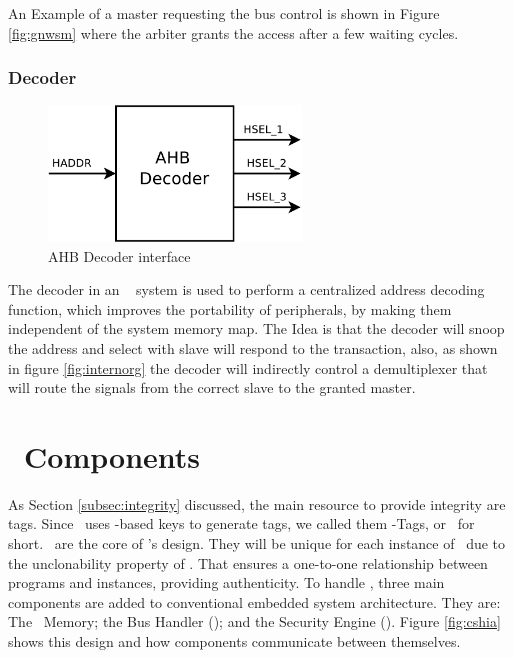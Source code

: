An Example of a master requesting the bus control is shown in Figure \ref{fig:gnwsm} where the arbiter grants the access after a few waiting cycles.


\subsubsection{Decoder}

\begin{figure}[ht]
    \centering
    \includegraphics[width=0.6\textwidth]{figures/pdf/ahb_decoder_new.pdf}
    \caption{AHB Decoder interface}
    \label{fig:decoder int}
\end{figure}
 The decoder in an \amba~ system is used to perform a centralized address decoding function, which improves the portability of peripherals, by making them independent of the system memory map. The Idea is that the decoder will snoop the address and select with slave will respond to the transaction, also, as shown in figure \ref{fig:internorg} the decoder will indirectly control a demultiplexer that will route the signals from the correct slave to the granted master.

 

\section{\cshia~Components}
\label{sec:Components-of-the-Architecture}
As Section \ref{subsec:integrity} discussed, the main resource to provide integrity are tags. Since \cshia~uses \puf-based keys to generate tags, we called them \puf-Tags, or \ptags~for short. \ptags~are the core of \cshia's design. They will be unique for each instance of \cshia~due to the unclonability property of \pufs. That ensures a one-to-one relationship between programs and instances, providing authenticity. To handle \ptags, three main components are added to conventional embedded system architecture. They are: The \ptag~Memory; the Bus Handler (\handler); and the Security Engine (\seceng). Figure \ref{fig:cshia} shows this design and how components communicate between themselves. 

